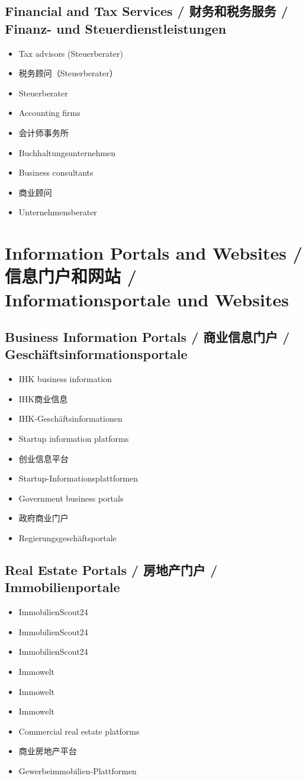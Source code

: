 \subsection{Financial and Tax Services / 财务和税务服务 / Finanz- und Steuerdienstleistungen}
\begin{itemize}
    \item Tax advisors (Steuerberater)
    \item 税务顾问（Steuerberater）
    \item Steuerberater
    \item Accounting firms
    \item 会计师事务所
    \item Buchhaltungsunternehmen
    \item Business consultants
    \item 商业顾问
    \item Unternehmensberater
\end{itemize}

\section{Information Portals and Websites / 信息门户和网站 / Informationsportale und Websites}

\subsection{Business Information Portals / 商业信息门户 / Geschäftsinformationsportale}
\begin{itemize}
    \item IHK business information
    \item IHK商业信息
    \item IHK-Geschäftsinformationen
    \item Startup information platforms
    \item 创业信息平台
    \item Startup-Informationsplattformen
    \item Government business portals
    \item 政府商业门户
    \item Regierungsgeschäftsportale
\end{itemize}

\subsection{Real Estate Portals / 房地产门户 / Immobilienportale}
\begin{itemize}
    \item ImmobilienScout24
    \item ImmobilienScout24
    \item ImmobilienScout24
    \item Immowelt
    \item Immowelt
    \item Immowelt
    \item Commercial real estate platforms
    \item 商业房地产平台
    \item Gewerbeimmobilien-Plattformen
\end{itemize}

